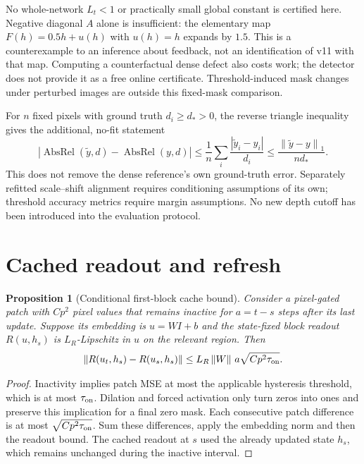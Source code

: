 \documentclass[11pt]{article}
\newtheorem{proposition}{Proposition}
\newcommand{\norm}[1]{\left\lVert#1\right\rVert}
\begin{document}
No whole-network $L_t<1$ or practically small global constant is certified
here. Negative diagonal $A$ alone is insufficient: the elementary map
$F(h)=0.5h+u(h)$ with $u(h)=h$ expands by $1.5$. This is a counterexample
to an inference about feedback, not an identification of v11 with that map.
Computing a counterfactual dense defect also costs work; the detector does
not provide it as a free online certificate. Threshold-induced mask changes
under perturbed images are outside this fixed-mask comparison.

For $n$ fixed pixels with ground truth $d_i\ge d_*>0$, the reverse triangle
inequality gives the additional, no-fit statement
\begin{equation}
 |\operatorname{AbsRel}(\widetilde y,d)-\operatorname{AbsRel}(y,d)|
 \le \frac1n\sum_i\frac{|\widetilde y_i-y_i|}{d_i}
 \le \frac{\norm{\widetilde y-y}_1}{nd_*}.
\end{equation}
This does not remove the dense reference's own ground-truth error. Separately
refitted scale--shift alignment requires conditioning assumptions of its own;
threshold accuracy metrics require margin assumptions. No new depth cutoff
has been introduced into the evaluation protocol.

\section{Cached readout and refresh}
\begin{proposition}[Conditional first-block cache bound]\label{prop:cache}
Consider a pixel-gated patch with $C p^2$ pixel values that remains inactive
for $a=t-s$ steps after its last update. Suppose its embedding is $u=WI+b$
and the state-fixed block readout $R(u,h_s)$ is $L_R$-Lipschitz in $u$ on
the relevant region. Then
\begin{equation}\label{eq:cache}
 \norm{R(u_t,h_s)-R(u_s,h_s)}
 \le L_R\norm{W}\,a\sqrt{Cp^2\tau_{\rm on}}.
\end{equation}
\end{proposition}
\begin{proof}
Inactivity implies patch MSE at most the applicable hysteresis threshold,
which is at most $\tau_{\rm on}$. Dilation and forced activation only turn
zeros into ones and preserve this implication for a final zero mask.
Each consecutive patch difference is at most $\sqrt{Cp^2\tau_{\rm on}}$.
Sum these differences, apply the embedding norm and then the readout bound.
The cached readout at $s$ used the already updated state $h_s$, which remains
unchanged during the inactive interval.
\end{proof}
\end{document}
